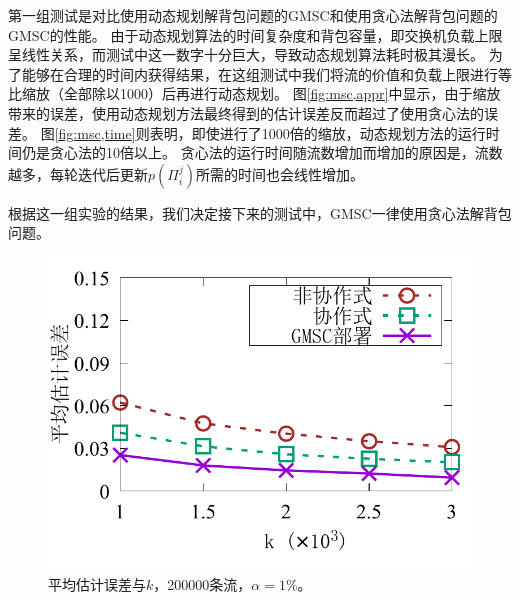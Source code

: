 第一组测试是对比使用动态规划解背包问题的GMSC和使用贪心法解背包问题的GMSC的性能。
由于动态规划算法的时间复杂度和背包容量，即交换机负载上限呈线性关系，而测试中这一数字十分巨大，导致动态规划算法耗时极其漫长。
为了能够在合理的时间内获得结果，在这组测试中我们将流的价值和负载上限进行等比缩放（全部除以1000）后再进行动态规划。
图\ref{fig:msc,appr}中显示，由于缩放带来的误差，使用动态规划方法最终得到的估计误差反而超过了使用贪心法的误差。
图\ref{fig:msc,time}则表明，即使进行了1000倍的缩放，动态规划方法的运行时间仍是贪心法的10倍以上。
贪心法的运行时间随流数增加而增加的原因是，流数越多，每轮迭代后更新$p(\Pi_i^j)$所需的时间也会线性增加。

根据这一组实验的结果，我们决定接下来的测试中，GMSC一律使用贪心法解背包问题。

\begin{figure}[ht]
	\centering
	\begin{minipage}[t]{0.48\linewidth}		
		\centering
		\includegraphics[width=\linewidth]{fig/msc_k_appr.pdf}
		\caption{\textnormal{平均估计误差与$k$，200000条流，$\alpha = 1\%$。}}
		\label{fig:msc,err,k}
	\end{minipage}\vspace{-0.6em}\hspace{0.4em}
	\begin{minipage}[t]{0.48\linewidth}
		\centering

\end{minipage}
\end{figure}

